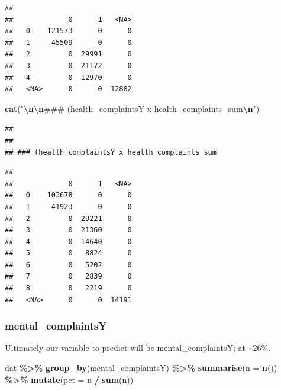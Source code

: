 \documentclass[
]{article}
\newenvironment{Shaded}{\begin{snugshade}}{\end{snugshade}}
\newcommand{\AttributeTok}[1]{\textcolor[rgb]{0.13,0.29,0.53}{#1}}
\newcommand{\FunctionTok}[1]{\textcolor[rgb]{0.13,0.29,0.53}{\textbf{#1}}}
\newcommand{\NormalTok}[1]{#1}
\newcommand{\SpecialCharTok}[1]{\textcolor[rgb]{0.81,0.36,0.00}{\textbf{#1}}}
\newcommand{\StringTok}[1]{\textcolor[rgb]{0.31,0.60,0.02}{#1}}
\begin{document}
\begin{verbatim}
##       
##             0      1   <NA>
##   0    121573      0      0
##   1     45509      0      0
##   2         0  29991      0
##   3         0  21172      0
##   4         0  12970      0
##   <NA>      0      0  12882
\end{verbatim}

\begin{Shaded}
\begin{Highlighting}[]
\FunctionTok{cat}\NormalTok{(}\StringTok{"}\SpecialCharTok{\textbackslash{}n\textbackslash{}n}\StringTok{\#\#\# (health\_complaintsY x health\_complaints\_sum}\SpecialCharTok{\textbackslash{}n}\StringTok{"}\NormalTok{)}
\end{Highlighting}
\end{Shaded}

\begin{verbatim}
## 
## 
## ### (health_complaintsY x health_complaints_sum
\end{verbatim}

\begin{Shaded}
\end{Shaded}

\begin{verbatim}
##       
##             0      1   <NA>
##   0    103678      0      0
##   1     41923      0      0
##   2         0  29221      0
##   3         0  21360      0
##   4         0  14640      0
##   5         0   8824      0
##   6         0   5202      0
##   7         0   2839      0
##   8         0   2219      0
##   <NA>      0      0  14191
\end{verbatim}

\subsubsection{mental\_complaintsY}\label{mental_complaintsy}

Ultimately our variable to predict will be mental\_complaintsY; at
\textasciitilde26\%.

\begin{Shaded}
\begin{Highlighting}[]
\NormalTok{dat }\SpecialCharTok{\%\textgreater{}\%}
  \FunctionTok{group\_by}\NormalTok{(mental\_complaintsY) }\SpecialCharTok{\%\textgreater{}\%}
  \FunctionTok{summarise}\NormalTok{(}\AttributeTok{n =} \FunctionTok{n}\NormalTok{()) }\SpecialCharTok{\%\textgreater{}\%}
  \FunctionTok{mutate}\NormalTok{(}\AttributeTok{pct =}\NormalTok{ n }\SpecialCharTok{/} \FunctionTok{sum}\NormalTok{(n))}
\end{Highlighting}
\end{Shaded}
\end{document}
